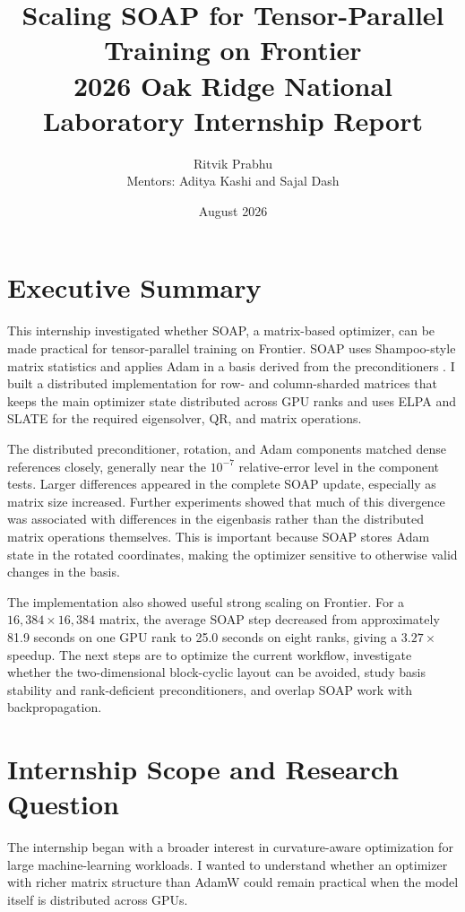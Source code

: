 \documentclass[11pt]{article}
\title{\textbf{Scaling SOAP for Tensor-Parallel Training on Frontier}\\
\large 2026 Oak Ridge National Laboratory Internship Report}
\author{Ritvik Prabhu\\
Mentors: Aditya Kashi and Sajal Dash}
\date{August 2026}
\begin{document}
\maketitle

\section*{Executive Summary}

This internship investigated whether SOAP, a matrix-based optimizer, can be made practical for tensor-parallel training on Frontier. SOAP uses Shampoo-style matrix statistics and applies Adam in a basis derived from the preconditioners \citep{vyas2024soap}. I built a distributed implementation for row- and column-sharded matrices that keeps the main optimizer state distributed across GPU ranks and uses ELPA and SLATE for the required eigensolver, QR, and matrix operations.

The distributed preconditioner, rotation, and Adam components matched dense references closely, generally near the $10^{-7}$ relative-error level in the component tests. Larger differences appeared in the complete SOAP update, especially as matrix size increased. Further experiments showed that much of this divergence was associated with differences in the eigenbasis rather than the distributed matrix operations themselves. This is important because SOAP stores Adam state in the rotated coordinates, making the optimizer sensitive to otherwise valid changes in the basis.

The implementation also showed useful strong scaling on Frontier. For a $16{,}384\times16{,}384$ matrix, the average SOAP step decreased from approximately 81.9 seconds on one GPU rank to 25.0 seconds on eight ranks, giving a $3.27\times$ speedup. The next steps are to optimize the current workflow, investigate whether the two-dimensional block-cyclic layout can be avoided, study basis stability and rank-deficient preconditioners, and overlap SOAP work with backpropagation.


\section{Internship Scope and Research Question}

The internship began with a broader interest in curvature-aware optimization for large machine-learning workloads. I wanted to understand whether an optimizer with richer matrix structure than AdamW could remain practical when the model itself is distributed across GPUs.
\end{document}

